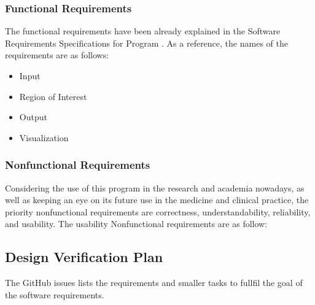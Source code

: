 \documentclass[12pt, titlepage]{article}
\begin{document}
\subsubsection{Functional Requirements}
The functional requirements have been already explained in the Software Requirements Specifications for Program \progname{}. As a reference, the names of the requirements are as follows:
\begin{itemize}
\item {Input}
\item {Region of Interest}
\item {Output}
\item {Visualization}
\end{itemize} 


\subsubsection{Nonfunctional Requirements}
Considering the use of this program in the research and academia nowadays, as well as keeping an eye on its future use in the medicine and clinical practice, the priority nonfunctional
requirements are correctness, understandability, reliability, and usability. The usability Nonfunctional requirements are as follow:
%





\subsection{Design Verification Plan}

The GitHub issues lists the requirements and smaller tasks to fullfil the goal of the software requirements.
%
%
\end{document}
